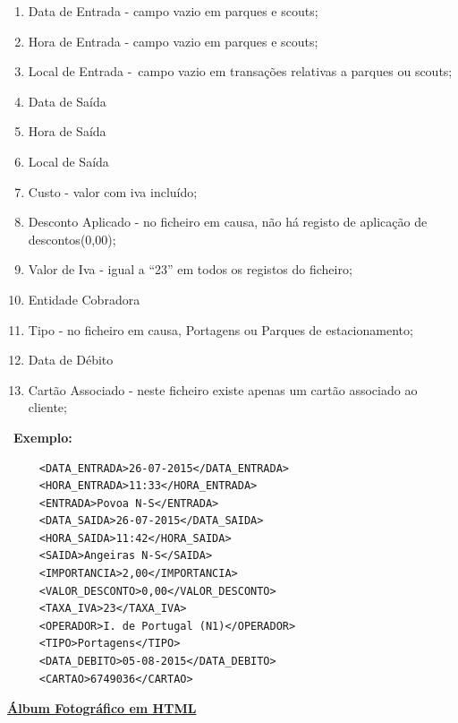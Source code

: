 \documentclass{report}
\begin{document}
 \begin{enumerate}
     \item Data de Entrada - campo vazio em parques e scouts;
     \item Hora de Entrada - campo vazio em parques e scouts;
     \item Local de Entrada - campo vazio em transa\c{c}\~oes relativas a parques ou scouts;
     \item Data de Saída
     \item Hora de Saída
     \item Local de Saída
     \item Custo - valor com iva incluído;
     \item Desconto Aplicado - no ficheiro em causa, n\~ao há registo de aplica\c{c}\~ao de descontos(0,00);
     \item Valor de Iva - igual a “23” em todos os registos do ficheiro;
     \item Entidade Cobradora
     \item Tipo - no ficheiro em causa, Portagens ou Parques de estacionamento;
     \item Data de Débito
     \item Cart\~ao Associado - neste ficheiro existe apenas um cart\~ao associado ao cliente;
 \end{enumerate}
\
\textbf{Exemplo:}
 \
 \begin{verbatim}
     <DATA_ENTRADA>26-07-2015</DATA_ENTRADA>
     <HORA_ENTRADA>11:33</HORA_ENTRADA>
     <ENTRADA>Povoa N-S</ENTRADA>
     <DATA_SAIDA>26-07-2015</DATA_SAIDA>
     <HORA_SAIDA>11:42</HORA_SAIDA>
     <SAIDA>Angeiras N-S</SAIDA>
     <IMPORTANCIA>2,00</IMPORTANCIA>
     <VALOR_DESCONTO>0,00</VALOR_DESCONTO>
     <TAXA_IVA>23</TAXA_IVA>
     <OPERADOR>I. de Portugal (N1)</OPERADOR>
     <TIPO>Portagens</TIPO>
     <DATA_DEBITO>05-08-2015</DATA_DEBITO>
     <CARTAO>6749036</CARTAO>
 \end{verbatim}

\textbf{\underline{Álbum Fotográfico em HTML}}
\end{document}
